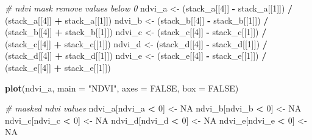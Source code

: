 \documentclass[12pt,twoside]{reedthesis}
\newenvironment{Shaded}{\begin{snugshade}}{\end{snugshade}}
\newcommand{\CommentTok}[1]{\textcolor[rgb]{0.56,0.35,0.01}{\textit{#1}}}
\newcommand{\DataTypeTok}[1]{\textcolor[rgb]{0.13,0.29,0.53}{#1}}
\newcommand{\DecValTok}[1]{\textcolor[rgb]{0.00,0.00,0.81}{#1}}
\newcommand{\KeywordTok}[1]{\textcolor[rgb]{0.13,0.29,0.53}{\textbf{#1}}}
\newcommand{\NormalTok}[1]{#1}
\newcommand{\OperatorTok}[1]{\textcolor[rgb]{0.81,0.36,0.00}{\textbf{#1}}}
\newcommand{\OtherTok}[1]{\textcolor[rgb]{0.56,0.35,0.01}{#1}}
\newcommand{\StringTok}[1]{\textcolor[rgb]{0.31,0.60,0.02}{#1}}
\begin{document}
\begin{Shaded}
\begin{Highlighting}[]
{\CommentTok{# ndvi mask remove values below 0}
\NormalTok{ndvi_a <-}\StringTok{ }\NormalTok{(stack_a[[}\DecValTok{4}\NormalTok{]] }\OperatorTok{-}\StringTok{ }\NormalTok{stack_a[[}\DecValTok{1}\NormalTok{]]) }\OperatorTok{/}\StringTok{ }\NormalTok{(stack_a[[}\DecValTok{4}\NormalTok{]] }\OperatorTok{+}\StringTok{ }\NormalTok{stack_a[[}\DecValTok{1}\NormalTok{]])}
\NormalTok{ndvi_b <-}\StringTok{ }\NormalTok{(stack_b[[}\DecValTok{4}\NormalTok{]] }\OperatorTok{-}\StringTok{ }\NormalTok{stack_b[[}\DecValTok{1}\NormalTok{]]) }\OperatorTok{/}\StringTok{ }\NormalTok{(stack_b[[}\DecValTok{4}\NormalTok{]] }\OperatorTok{+}\StringTok{ }\NormalTok{stack_b[[}\DecValTok{1}\NormalTok{]])}
\NormalTok{ndvi_c <-}\StringTok{ }\NormalTok{(stack_c[[}\DecValTok{4}\NormalTok{]] }\OperatorTok{-}\StringTok{ }\NormalTok{stack_c[[}\DecValTok{1}\NormalTok{]]) }\OperatorTok{/}\StringTok{ }\NormalTok{(stack_c[[}\DecValTok{4}\NormalTok{]] }\OperatorTok{+}\StringTok{ }\NormalTok{stack_c[[}\DecValTok{1}\NormalTok{]])}
\NormalTok{ndvi_d <-}\StringTok{ }\NormalTok{(stack_d[[}\DecValTok{4}\NormalTok{]] }\OperatorTok{-}\StringTok{ }\NormalTok{stack_d[[}\DecValTok{1}\NormalTok{]]) }\OperatorTok{/}\StringTok{ }\NormalTok{(stack_d[[}\DecValTok{4}\NormalTok{]] }\OperatorTok{+}\StringTok{ }\NormalTok{stack_d[[}\DecValTok{1}\NormalTok{]])}
\NormalTok{ndvi_e <-}\StringTok{ }\NormalTok{(stack_e[[}\DecValTok{4}\NormalTok{]] }\OperatorTok{-}\StringTok{ }\NormalTok{stack_e[[}\DecValTok{1}\NormalTok{]]) }\OperatorTok{/}\StringTok{ }\NormalTok{(stack_e[[}\DecValTok{4}\NormalTok{]] }\OperatorTok{+}\StringTok{ }\NormalTok{stack_e[[}\DecValTok{1}\NormalTok{]])}

\KeywordTok{plot}\NormalTok{(ndvi_a, }\DataTypeTok{main =} \StringTok{"NDVI"}\NormalTok{, }\DataTypeTok{axes =} \OtherTok{FALSE}\NormalTok{, }\DataTypeTok{box =} \OtherTok{FALSE}\NormalTok{)}

\CommentTok{# masked ndvi values}
\NormalTok{ndvi_a[ndvi_a }\OperatorTok{<}\StringTok{ }\DecValTok{0}\NormalTok{] <-}\StringTok{ }\OtherTok{NA}
\NormalTok{ndvi_b[ndvi_b }\OperatorTok{<}\StringTok{ }\DecValTok{0}\NormalTok{] <-}\StringTok{ }\OtherTok{NA}
\NormalTok{ndvi_c[ndvi_c }\OperatorTok{<}\StringTok{ }\DecValTok{0}\NormalTok{] <-}\StringTok{ }\OtherTok{NA}
\NormalTok{ndvi_d[ndvi_d }\OperatorTok{<}\StringTok{ }\DecValTok{0}\NormalTok{] <-}\StringTok{ }\OtherTok{NA}
\NormalTok{ndvi_e[ndvi_e }\OperatorTok{<}\StringTok{ }\DecValTok{0}\NormalTok{] <-}\StringTok{ }\OtherTok{NA}

}
\end{Highlighting}
\end{Shaded}
\end{document}
